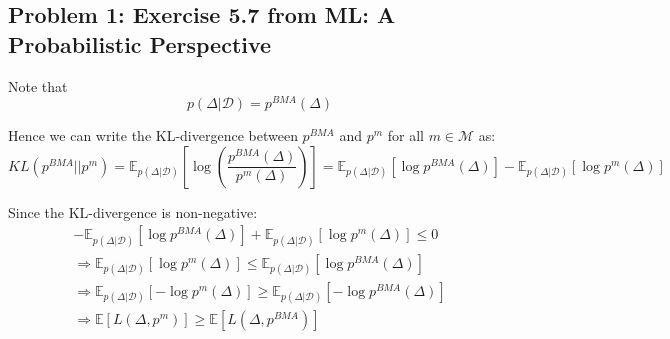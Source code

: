 \documentclass{article}
\begin{document}
\subsection*{Problem 1: Exercise 5.7 from ML: A Probabilistic Perspective}
\begin{flushleft}
Note that
\begin{equation}
p(\Delta | \mathcal{D}) = p^{BMA}(\Delta)
\end{equation}

Hence we can write the KL-divergence between \(p^{BMA}\) and \(p^{m}\) for all \(m \in \mathcal{M}\) as:
\begin{equation}
KL(p^{BMA} || p^{m}) = \mathbb{E}_{p(\Delta | \mathcal{D})} \left[\log\left(\frac{p^{BMA}(\Delta)}{p^{m}(\Delta)}\right)\right] = \mathbb{E}_{p(\Delta | \mathcal{D})} [\log p^{BMA}(\Delta)] - \mathbb{E}_{p(\Delta | \mathcal{D})} [\log p^{m}(\Delta)]
\end{equation}

Since the KL-divergence is non-negative:
\begin{multline}
-\mathbb{E}_{p(\Delta | \mathcal{D})} [\log p^{BMA}(\Delta)] + \mathbb{E}_{p(\Delta | \mathcal{D})} [\log p^{m}(\Delta)] \leq 0 \\\Rightarrow \mathbb{E}_{p(\Delta | \mathcal{D})} [\log p^{m}(\Delta)] \leq \mathbb{E}_{p(\Delta | \mathcal{D})} [\log p^{BMA}(\Delta)] \\ \Rightarrow \mathbb{E}_{p(\Delta | \mathcal{D})} [-\log p^{m}(\Delta)] \geq \mathbb{E}_{p(\Delta | \mathcal{D})} [-\log p^{BMA}(\Delta)] \\ \Rightarrow \mathbb{E}[L(\Delta, p^{m})] \geq \mathbb{E}[L(\Delta, p^{BMA})]
\end{multline}
\end{flushleft}
\end{document}
